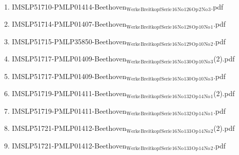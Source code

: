 \documentclass[11pt]{article}
\begin{document}
\begin{enumerate}
\begin{enumerate}
\begin{enumerate}
\item IMSLP51710-PMLP01414-Beethoven$_{\text{Werke}}$$_{\text{Breitkopf}}$$_{\text{Serie}}$$_{\text{16}}$$_{\text{No}}$$_{\text{126}}$$_{\text{Op}}$$_{\text{2}}$$_{\text{No}}$$_{\text{3}}$.pdf
\label{sec-1-1-1-1-44-9-6-7-52}

\item IMSLP51714-PMLP01407-Beethoven$_{\text{Werke}}$$_{\text{Breitkopf}}$$_{\text{Serie}}$$_{\text{16}}$$_{\text{No}}$$_{\text{128}}$$_{\text{Op}}$$_{\text{10}}$$_{\text{No}}$$_{\text{1}}$.pdf
\label{sec-1-1-1-1-44-9-6-7-53}

\item IMSLP51715-PMLP35850-Beethoven$_{\text{Werke}}$$_{\text{Breitkopf}}$$_{\text{Serie}}$$_{\text{16}}$$_{\text{No}}$$_{\text{129}}$$_{\text{Op}}$$_{\text{10}}$$_{\text{No}}$$_{\text{2}}$.pdf
\label{sec-1-1-1-1-44-9-6-7-54}

\item IMSLP51717-PMLP01409-Beethoven$_{\text{Werke}}$$_{\text{Breitkopf}}$$_{\text{Serie}}$$_{\text{16}}$$_{\text{No}}$$_{\text{130}}$$_{\text{Op}}$$_{\text{10}}$$_{\text{No}}$$_{\text{3}}$(2).pdf
\label{sec-1-1-1-1-44-9-6-7-55}

\item IMSLP51717-PMLP01409-Beethoven$_{\text{Werke}}$$_{\text{Breitkopf}}$$_{\text{Serie}}$$_{\text{16}}$$_{\text{No}}$$_{\text{130}}$$_{\text{Op}}$$_{\text{10}}$$_{\text{No}}$$_{\text{3}}$.pdf
\label{sec-1-1-1-1-44-9-6-7-56}

\item IMSLP51719-PMLP01411-Beethoven$_{\text{Werke}}$$_{\text{Breitkopf}}$$_{\text{Serie}}$$_{\text{16}}$$_{\text{No}}$$_{\text{132}}$$_{\text{Op}}$$_{\text{14}}$$_{\text{No}}$$_{\text{1}}$(2).pdf
\label{sec-1-1-1-1-44-9-6-7-57}

\item IMSLP51719-PMLP01411-Beethoven$_{\text{Werke}}$$_{\text{Breitkopf}}$$_{\text{Serie}}$$_{\text{16}}$$_{\text{No}}$$_{\text{132}}$$_{\text{Op}}$$_{\text{14}}$$_{\text{No}}$$_{\text{1}}$.pdf
\label{sec-1-1-1-1-44-9-6-7-58}

\item IMSLP51721-PMLP01412-Beethoven$_{\text{Werke}}$$_{\text{Breitkopf}}$$_{\text{Serie}}$$_{\text{16}}$$_{\text{No}}$$_{\text{133}}$$_{\text{Op}}$$_{\text{14}}$$_{\text{No}}$$_{\text{2}}$(2).pdf
\label{sec-1-1-1-1-44-9-6-7-59}

\item IMSLP51721-PMLP01412-Beethoven$_{\text{Werke}}$$_{\text{Breitkopf}}$$_{\text{Serie}}$$_{\text{16}}$$_{\text{No}}$$_{\text{133}}$$_{\text{Op}}$$_{\text{14}}$$_{\text{No}}$$_{\text{2}}$.pdf
\label{sec-1-1-1-1-44-9-6-7-60}


\end{enumerate}
\end{enumerate}
\end{enumerate}
\end{document}
